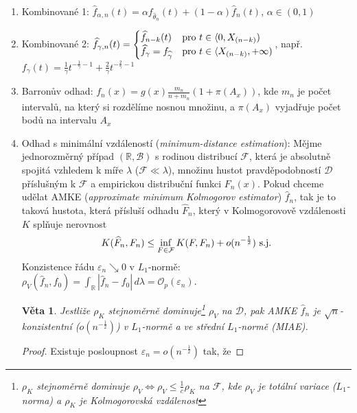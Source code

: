 \documentclass{article}
\newtheorem{theorem}[subsubsection]{Věta}
\theoremstyle{remark}
\theoremstyle{plain}
\theoremstyle{definition}
\theoremstyle{remark}
\begin{document}
\begin{enumerate}
    \item Kombinované 1: $\widehat{f}_{\alpha,n}(t)=\alpha f_{\widehat{\theta}_{n}}(t)+(1-\alpha)\widehat{f}_n(t)$, $\alpha\in(0,1)$
    \item Kombinované 2: $\widehat{f}_{\gamma,n}(t)=\begin{cases}
    \widehat{f}_{n-k}(t) & \textnormal{pro }t\in\langle 0,X_{(n-k)}) \\
    \widehat{f}_\gamma=f_{\widehat{\gamma}} & \textnormal{pro }t\in\langle X_{(n-k)},+\infty)
    \end{cases}$, např. $f_{\gamma}(t)=\frac{1}{\gamma}t^{-\frac{1}{\gamma}-1}+\frac{2}{\gamma}t^{-\frac{2}{\gamma}-1}$
    \item Barronův odhad: $f_n(x)=g(x)\frac{m_n}{n+m_n}(1+\pi(A_x))$, kde $m_n$ je počet intervalů, na který si rozdělíme nosnou množinu, a $\pi(A_x)$ vyjadřuje počet bodů na intervalu $A_x$
    \item Odhad s minimální vzdáleností (\textit{minimum-distance estimation}): Mějme jednorozměrný případ $(\mathbb{R},\mathcal{B})$ s rodinou distribucí $\mathcal{F}$, která je absolutně spojitá vzhledem k míře $\lambda$ ($\mathcal{F}\ll\lambda$), množinu hustot pravděpodobností $\mathcal{D}$ příslušným k $\mathcal{F}$ a empirickou distribuční funkci $F_n(x)$. Pokud chceme udělat AMKE (\textit{approximate minimum Kolmogorov estimator}) $\widehat{f}_n$, tak je to taková hustota, která přísluší odhadu $\widehat{F}_n$, který v Kolmogorovově vzdálenosti $K$ splňuje nerovnost
    \begin{align*}
        K(\widehat{F}_n,F_n)\leq \inf_{F\in\mathcal{F}} K(F,F_n) + o(n^{-\frac{1}{2}})\,\,\textnormal{s.j.}
    \end{align*}
    Konzistence řádu $\varepsilon_n\searrow 0$ v $L_1$-normě: $\rho_V(\widehat{f}_n,f_0)=\int_\mathbb{R}|\widehat{f}_n-f_0|\,d\lambda=\mathcal{O}_p(\varepsilon_n)$.
    \begin{theorem}
    Jestliže $\rho_K$ stejnoměrně dominuje\footnote{$\rho_K$ stejnoměrně dominuje $\rho_V \iff \rho_V\leq \frac{1}{c}\rho_K$ na $\mathcal{F}$, kde $\rho_V$ je totální variace ($L_1$-norma) a $\rho_K$ je Kolmogorovská vzdálenost} $\rho_V$ na $\mathcal{D}$, pak AMKE $\widehat{f}_n$ je $\sqrt{n}$-konzistentní ($o(n^{-\frac{1}{2}})$) v $L_1$-normě a ve střední $L_1$-normě (MIAE).
    \end{theorem}
    \begin{proof}
    Existuje posloupnost $\varepsilon_n=o(n^{-\frac{1}{2}})$ tak, že

\end{proof}
\end{enumerate}
\end{document}
